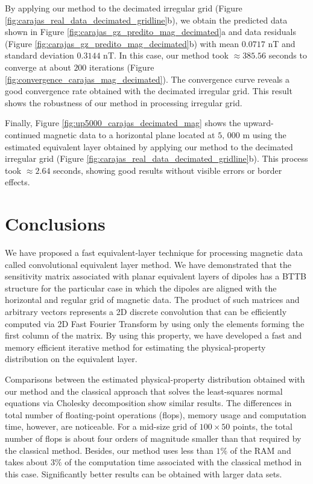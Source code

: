 \documentclass[manuscript]{geophysics}
\begin{document}
	By applying our method to the decimated irregular grid 
	(Figure \ref{fig:carajas_real_data_decimated_gridline}b), we obtain the predicted data shown in 
	Figure \ref{fig:carajas_gz_predito_mag_decimated}a and data residuals 
	(Figure \ref{fig:carajas_gz_predito_mag_decimated}b) with mean $0.0717$ nT and standard deviation 
	$0.3144$ nT. In this case, our method took $\approx 385.56$ seconds 
	to converge at about $200$ iterations (Figure \ref{fig:convergence_carajas_mag_decimated}).
	The convergence curve reveals a good convergence rate obtained with the decimated 
	irregular grid. This result shows the robustness of our method in processing irregular grid.
	
	Finally, Figure \ref{fig:up5000_carajas_decimated_mag} shows the upward-continued magnetic data to a
	horizontal plane located at $5, \,000$ m using the estimated equivalent layer obtained by applying our
	method to the decimated irregular grid (Figure \ref{fig:carajas_real_data_decimated_gridline}b).
	This process took $\approx 2.64$ seconds, showing good results without visible errors or border 
	effects.
	
	\section{Conclusions}
	
	We have proposed a fast equivalent-layer technique for processing magnetic data called
	convolutional equivalent layer method.
	We have demonstrated that the sensitivity matrix associated with planar 
	equivalent layers of dipoles has a BTTB structure for the particular case in which 
	the dipoles are aligned with the horizontal and regular grid of magnetic data.
	The product of such matrices and arbitrary vectors represents a 2D discrete convolution
	that can be efficiently computed via 2D Fast Fourier Transform by using only the 
	elements forming the first column of the matrix.
	By using this property, we have developed a fast and memory efficient iterative method for 
	estimating the physical-property distribution on the equivalent layer.
	
	Comparisons between the estimated physical-property distribution obtained with our method and 
	the classical approach that solves the least-squares normal equations via Cholesky decomposition 
	show similar results. 
	The differences in total number of floating-point operations (flops), memory usage and computation 
	time, however, are noticeable. 
	For a mid-size grid of $100 \times 50$ points, the total number of flops is about four orders of
	magnitude smaller than that required by the classical method. Besides, our method uses
	less than $1\%$ of the RAM and takes about $3\%$ of the computation time associated with
	the classical method in this case.%
	Significantly better results can be obtained with larger data sets.
	
\end{document}
